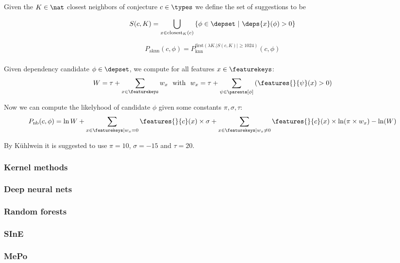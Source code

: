\begin{definition}
  Given the $K \in \nat$ closest neighbors of conjecture $c \in \types$ we define the set of suggestions to be

  $$
    S(c, K) = \bigcup_{x \in \text{closest}_K(c)} \left\{ \phi \in \depset ~|~ \deps{x}(\phi) > 0 \right\}
  $$
\end{definition}

\begin{definition}
  $$
    P_\text{aknn}(c, \phi) = P^{\text{first}(\lambda K . |S(c, K)| \geq 1024)}_\text{knn}(c, \phi)
  $$
\end{definition}

\subsubsection{\nb}

Given dependency candidate $\phi \in \depset$, we compute for all features $x \in \featurekeys$:
\[
  W = \tau + \sum_{x \in \featurekeys} w_x ~~\text{with}~~ w_x = \tau + \sum_{\psi \in \parents[\phi]} \left( \features{}{\psi}(x) > 0 \right)
\]

Now we can compute the likelyhood of candidate $\phi$ given some constants $\pi, \sigma, \tau$:
\[
	P_\text{nb}(c, \phi) = \ln W +
  \sum_{x \in \featurekeys | w_x = 0} \features{}{c}(x) \times \sigma +
  \sum_{x \in \featurekeys | w_x \neq 0} \features{}{c}(x) \times \ln(\pi \times w_x) - \ln(W)
\]

By K\"uhlwein \cite{kuhlwein2013mash} it is suggested to use $\pi = 10$, $\sigma = -15$ and $\tau = 20$.

\subsubsection{Kernel methods}
\subsubsection{Deep neural nets}
\subsubsection{Random forests}
\subsubsection{SInE}
\subsubsection{MePo}
